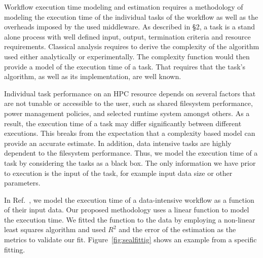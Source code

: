 Workflow execution time modeling and estimation requires a methodology of 
modeling the execution time of the individual tasks of the workflow as well as 
the overheads imposed by the used middleware. As described in \S2, a task is a 
stand alone process with well defined input, output, termination criteria and 
resource requirements. Classical analysis requires to derive the complexity of 
the algorithm used either analytically or experimentally. The complexity 
function would then provide a model of the execution time of a task. That 
requires that the task's algorithm, as well as its implementation, are well 
known. 

Individual task performance on an HPC resource depends on several factors that 
are not tunable or accessible to the user, such as shared filesystem 
performance, power management policies, and selected runtime system amongst 
others. As a result, the execution time of a task may differ significantly 
between different executions. This breaks from the expectation that a complexity 
based model can provide an accurate estimate. In addition, data intensive tasks 
are highly dependent to the filesystem performance. Thus, we model the 
execution time of a task by considering the tasks as a black box. The only 
information we have prior to execution is the input of the task, for example 
input data size or other parameters.

In Ref.~\cite{paraskevakos2019workflow}, we model the execution time of a 
data-intensive workflow as a function of their input data. Our proposed 
methodology uses a linear function to model the execution time. We fitted the 
function to the data by employing a non-linear least squares algorithm and used 
$R^{2}$ and the error of the estimation as the metrics to validate our fit. 
Figure~\ref{fig:sealfittig} shows an example from a specific fitting. 